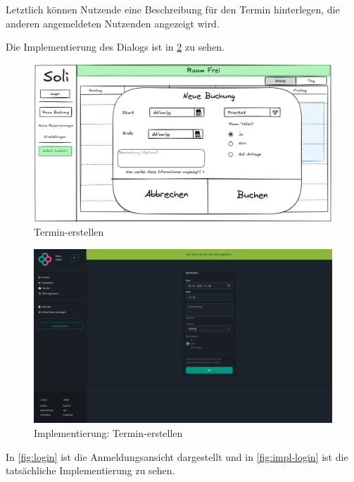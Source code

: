 Letztlich können Nutzende eine Beschreibung für den Termin hinterlegen, die anderen angemeldeten Nutzenden angezeigt wird.

Die Implementierung des Dialogs ist in \ref{fig:impl-buchung} zu sehen.

\begin{figure}[ht]
    \centering
    \includegraphics[width=\textwidth]{figures/mockup/bookings_create_form}
    \caption{Termin-erstellen}
    \label{fig:buchung}
\end{figure}
\pagebreak

\begin{figure}[ht]
    \centering
    \includegraphics[width=\textwidth]{figures/impl-views/bookings_create_form}
    \caption{Implementierung: Termin-erstellen}
    \label{fig:impl-buchung}
\end{figure}
\clearpage

In \ref{fig:login} ist die Anmeldungsansicht dargestellt und in \ref{fig:impl-login} ist die tatsächliche Implementierung zu sehen.


